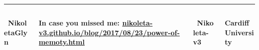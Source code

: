 \documentclass[usenames,dvipsnames,t]{beamer}
\begin{document}
\hrule height 3pt
\begin{columns}
    \begin{column}{.1\linewidth}

        \centering
        \textbf{ \faTwitter \ NikoletaGlyn}
    \end{column}
    \begin{column}{.55\linewidth}

        \centering
        \textbf{ In case you missed me: \url{nikoleta-v3.github.io/blog/2017/08/23/power-of-memoty.html}}
    \end{column}
    \begin{column}{.1\linewidth}

        \centering
        \textbf{ \faGithub \ Nikoleta-v3}
    \end{column}
    \begin{column}{.1\linewidth}

        \centering
        \textbf{Cardiff University}
    \end{column}
\end{columns}
\end{document}
